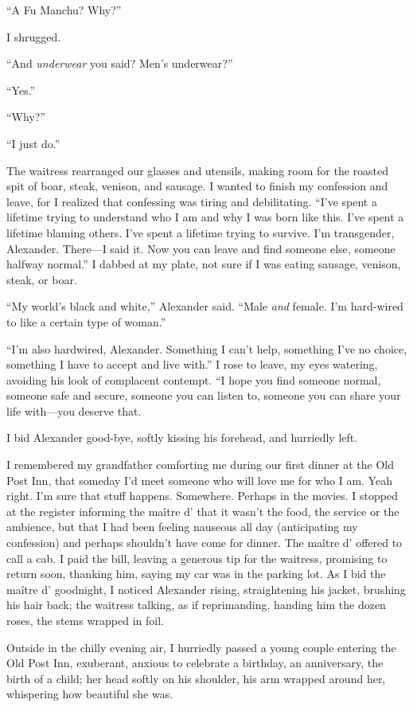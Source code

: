 ``A Fu Manchu? Why?''

I shrugged.

``And \emph{underwear} you said? Men's underwear?''

``Yes.''

``Why?''

``I just do.''

The waitress rearranged our glasses and utensils, making room for the
roasted spit of boar, steak, venison, and sausage. I wanted to finish my
confession and leave, for I realized that confessing was tiring and
debilitating. ``I've spent a lifetime trying to understand who I am and
why I was born like this. I've spent a lifetime blaming others. I've
spent a lifetime trying to survive. I'm transgender, Alexander.
There---I said it. Now you can leave and find someone else, someone
halfway normal.'' I dabbed at my plate, not sure if I was eating
sausage, venison, steak, or boar.

``My world's black and white,'' Alexander said. ``Male \emph{and}
female. I'm hard-wired to like a certain type of woman.''

``I'm also hardwired, Alexander. Something I can't help, something I've
no choice, something I have to accept and live with.'' I rose to leave,
my eyes watering, avoiding his look of complacent contempt. ``I hope you
find someone normal, someone safe and secure, someone you can listen to,
someone you can share your life with---you deserve that.

I bid Alexander good-bye, softly kissing his forehead, and hurriedly
left.

I remembered my grandfather comforting me during our first dinner at the
Old Post Inn, that someday I'd meet someone who will love me for who I
am. Yeah right. I'm sure that stuff happens. Somewhere. Perhaps in the
movies. I stopped at the register informing the maître d' that it wasn't
the food, the service or the ambience, but that I had been feeling
nauseous all day (anticipating my confession) and perhaps shouldn't have
come for dinner. The maître d' offered to call a cab. I paid the bill,
leaving a generous tip for the waitress, promising to return soon,
thanking him, saying my car was in the parking lot. As I bid the maître
d' goodnight, I noticed Alexander rising, straightening his jacket,
brushing his hair back; the waitress talking, as if reprimanding,
handing him the dozen roses, the stems wrapped in foil.

Outside in the chilly evening air, I hurriedly passed a young couple
entering the Old Post Inn, exuberant, anxious to celebrate a birthday,
an anniversary, the birth of a child; her head softly on his shoulder,
his arm wrapped around her, whispering how beautiful she was.

